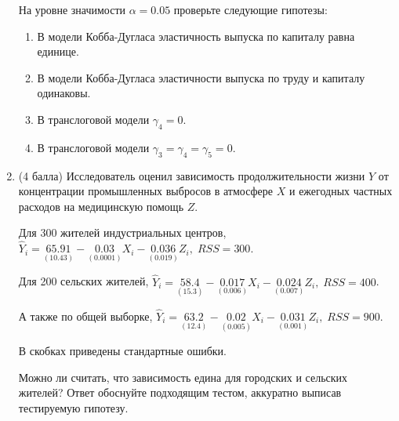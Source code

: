 \documentclass[12pt]{article}
\theoremstyle{definition}
\begin{document}
\begin{enumerate}

На уровне значимости $\alpha = 0.05$ проверьте следующие гипотезы:
\begin{enumerate}
\item В модели Кобба-Дугласа эластичность выпуска по капиталу равна единице.
\item В модели Кобба-Дугласа эластичности выпуска по труду и капиталу одинаковы.
\item В транслоговой модели $\gamma_4=0$.
\item В транслоговой модели $\gamma_3 = \gamma_4 = \gamma_5 = 0$.
\end{enumerate}

\newpage
\item
(4 балла)
Исследователь оценил зависимость продолжительности жизни $Y$ от концентрации  промышленных выбросов в атмосфере $X$ и ежегодных частных расходов на медицинскую помощь $Z$.

Для 300 жителей индустриальных центров, $\hat{Y}_i = \underset{(10.43)}{65.91} - \underset{(0.0001)}{0.03}X_i - \underset{(0.019)}{0.036}Z_i, \; RSS = 300$.

Для 200 сельских жителей, $\hat{Y}_i = \underset{(15.3)}{58.4} - \underset{(0.006)}{0.017}X_i - \underset{(0.007)}{0.024}Z_i, \; RSS = 400$.

А также по общей выборке, $\hat{Y}_i = \underset{(12.4)}{63.2} - \underset{(0.005)}{0.02}X_i - \underset{(0.001)}{0.031}Z_i, \; RSS = 900$.

В скобках приведены стандартные ошибки.

Можно ли считать, что зависимость едина для городских и сельских жителей?
Ответ обоснуйте подходящим тестом, аккуратно выписав тестируемую гипотезу.
\newpage


\end{enumerate}
\end{document}
